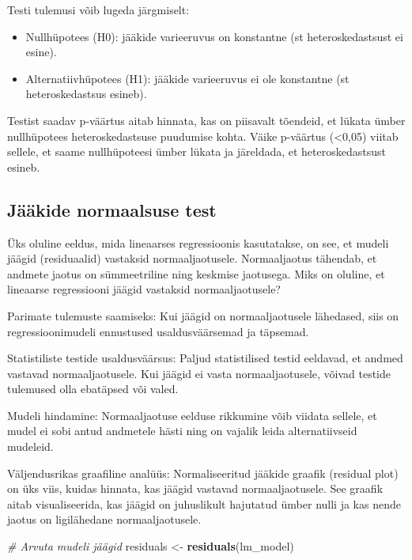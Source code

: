 \documentclass[
]{book}
\newenvironment{Shaded}{\begin{snugshade}}{\end{snugshade}}
\newcommand{\CommentTok}[1]{\textcolor[rgb]{0.56,0.35,0.01}{\textit{#1}}}
\newcommand{\FunctionTok}[1]{\textcolor[rgb]{0.13,0.29,0.53}{\textbf{#1}}}
\newcommand{\NormalTok}[1]{#1}
\newcommand{\OtherTok}[1]{\textcolor[rgb]{0.56,0.35,0.01}{#1}}
\providecommand{\tightlist}{%
  \setlength{\itemsep}{0pt}\setlength{\parskip}{0pt}}
\renewenvironment{Shaded} {\begin{snugshade}\footnotesize} {\end{snugshade}}
\begin{document}
Testi tulemusi võib lugeda järgmiselt:

\begin{itemize}
\tightlist
\item
  Nullhüpotees (H0): jääkide varieeruvus on konstantne (st heteroskedastsust ei esine).
\item
  Alternatiivhüpotees (H1): jääkide varieeruvus ei ole konstantne (st heteroskedastsus esineb).
\end{itemize}

Testist saadav p-väärtus aitab hinnata, kas on piisavalt tõendeid, et lükata ümber nullhüpotees heteroskedastsuse puudumise kohta. Väike p-väärtus (\textless0,05) viitab sellele, et saame nullhüpoteesi ümber lükata ja järeldada, et heteroskedastsust esineb.

\subsection{Jääkide normaalsuse test}\label{juxe4uxe4kide-normaalsuse-test}

Üks oluline eeldus, mida lineaarses regressioonis kasutatakse, on see, et mudeli jäägid (residuaalid) vastaksid normaaljaotusele. Normaaljaotus tähendab, et andmete jaotus on sümmeetriline ning keskmise jaotusega. Miks on oluline, et lineaarse regressiooni jäägid vastaksid normaaljaotusele?

Parimate tulemuste saamiseks: Kui jäägid on normaaljaotusele lähedased, siis on regressioonimudeli ennustused usaldusväärsemad ja täpsemad.

Statistiliste testide usaldusväärsus: Paljud statistilised testid eeldavad, et andmed vastavad normaaljaotusele. Kui jäägid ei vasta normaaljaotusele, võivad testide tulemused olla ebatäpsed või valed.

Mudeli hindamine: Normaaljaotuse eelduse rikkumine võib viidata sellele, et mudel ei sobi antud andmetele hästi ning on vajalik leida alternatiivseid mudeleid.

Väljendusrikas graafiline analüüs: Normaliseeritud jääkide graafik (residual plot) on üks viis, kuidas hinnata, kas jäägid vastavad normaaljaotusele. See graafik aitab visualiseerida, kas jäägid on juhuslikult hajutatud ümber nulli ja kas nende jaotus on ligilähedane normaaljaotusele.

\begin{Shaded}
\begin{Highlighting}[]
\CommentTok{\# Arvuta mudeli jäägid}
\NormalTok{residuals }\OtherTok{\textless{}{-}} \FunctionTok{residuals}\NormalTok{(lm\_model)}
\end{Highlighting}
\end{Shaded}
\end{document}
